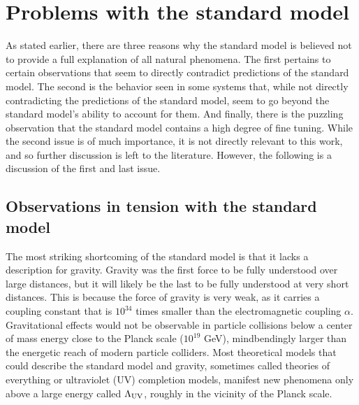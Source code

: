 \section{Problems with the standard model}
\label{sec:problems}
As stated earlier, there are three reasons why the standard model is believed not to provide a full explanation of all natural phenomena. The first pertains to certain observations that seem to directly contradict predictions of the standard model. The second is the behavior seen in some systems that, while not directly contradicting the predictions of the standard model, seem to go beyond the standard model's ability to account for them. And finally, there is the puzzling observation that the standard model contains a high degree of fine tuning.  While the second issue is of much importance, it is not directly relevant to this work, and so further discussion is left to the literature. However, the following is a discussion of the first and last issue.

\subsection{Observations in tension with the standard model}
The most striking shortcoming of the standard model is that it lacks a description for gravity.  Gravity was the first force to be fully understood over large distances, but it will likely be the last to be fully understood at very short distances. This is because the force of gravity is very weak, as it carries a coupling constant that is $10^{34}$ times smaller than the electromagnetic coupling $\alpha$. Gravitational effects would not be observable in particle collisions below a center of mass energy close to the Planck scale ($10^{19}$ GeV), mindbendingly larger than the energetic reach of modern particle colliders. Most theoretical models that could describe the standard model and gravity, sometimes called theories of everything or ultraviolet (UV) completion models, manifest new phenomena only above a large energy called $\Lambda_{\rm UV}$, roughly in the vicinity of the Planck scale. 

